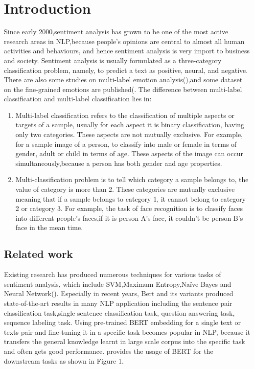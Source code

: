 \documentclass[12pt,twocolumn,letterpaper]{article}
\begin{document}
\section{Introduction}
Since early 2000,sentiment analysis has grown to be one of the most active research areas in NLP,because people’s opinions are central to almost all human activities and behaviours, and hence sentiment analysis is very import to business and society. 
Sentiment analysis is usually formulated as a three-category classification problem, namely, to predict a text as positive, neural, and negative. 
There are also some studies on multi-label emotion analysis(\cite{Ref2}),and some dataset on the fine-grained emotions are published(\cite{Ref1}.
The difference between multi-label classification and multi-label classification lies in:  
\begin{enumerate}
\item Multi-label classification refers to the classification of multiple aspects or targets of a sample, usually for each aspect it is binary classification, having only two categories. These aspects are not mutually exclusive. For example, for a sample image of a person, to classify into male or female in terms of gender, adult or child in terms of age. These aspects of the image can occur simultaneously,because a person has both gender and age properties.  
\item Multi-classification problem is to tell which category a sample belongs to, the value of category is more than 2. These categories are mutually exclusive meaning that if a sample belongs to category 1, it cannot belong to category 2 or category 3. For example, the task of face recognition is to classify faces into different people's faces,if it is person A's face, it couldn't be person B's face in the mean time.  
\end{enumerate}
\subsection{Related work}

Existing research has produced numerous techniques for various tasks of sentiment analysis, which include SVM,Maximum Entropy,Naïve Bayes and Neural Network(\cite{Ref3}). Especially in recent years, Bert and its variants produced state-of-the-art results in many NLP application including the sentence pair classification task,single sentence classification task, question answering task, sequence labeling task. Using pre-trained BERT embedding for a single text or texts pair and fine-tuning it in a specific task becomes popular in NLP, because it transfers the general knowledge learnt in large scale corpus into the specific task and often gets good performance. \cite{Ref4} provides the usage of BERT for the downstream tasks as shown in Figure 1.
\end{document}

